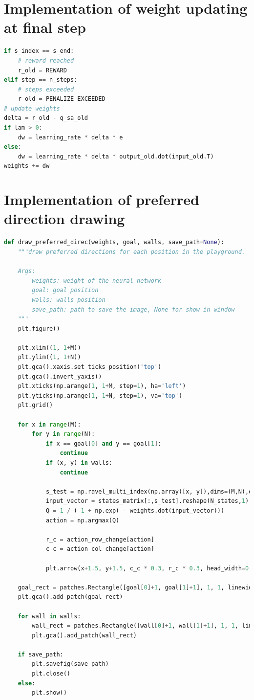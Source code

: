 \documentclass[conference]{IEEEtran}
\begin{document}
\section{Implementation of weight updating at final step}

\begin{lstlisting}[language=Python]
if s_index == s_end:
    # reward reached
    r_old = REWARD
elif step == n_steps:
    # steps exceeded
    r_old = PENALIZE_EXCEEDED
# update weights
delta = r_old - q_sa_old
if lam > 0:
    dw = learning_rate * delta * e
else:
    dw = learning_rate * delta * output_old.dot(input_old.T)
weights += dw

\end{lstlisting}

\section{Implementation of preferred direction drawing}

\begin{lstlisting}[language=Python]
def draw_preferred_direc(weights, goal, walls, save_path=None):
    """draw preferred directions for each position in the playground.

    Args:
        weights: weight of the neural network
        goal: goal position
        walls: walls position
        save_path: path to save the image, None for show in window
    """
    plt.figure()
    
    plt.xlim((1, 1+M))
    plt.ylim((1, 1+N))
    plt.gca().xaxis.set_ticks_position('top')
    plt.gca().invert_yaxis()
    plt.xticks(np.arange(1, 1+M, step=1), ha='left')
    plt.yticks(np.arange(1, 1+N, step=1), va='top')
    plt.grid()

    for x in range(M):
        for y in range(N):
            if x == goal[0] and y == goal[1]:
                continue
            if (x, y) in walls:
                continue

            s_test = np.ravel_multi_index(np.array([x, y]),dims=(M,N),order='F')
            input_vector = states_matrix[:,s_test].reshape(N_states,1)
            Q = 1 / ( 1 + np.exp( - weights.dot(input_vector)))
            action = np.argmax(Q)

            r_c = action_row_change[action]
            c_c = action_col_change[action]
            
            plt.arrow(x+1.5, y+1.5, c_c * 0.3, r_c * 0.3, head_width=0.06, head_length=0.1)

    goal_rect = patches.Rectangle([goal[0]+1, goal[1]+1], 1, 1, linewidth=1, edgecolor='lime', facecolor='lime')
    plt.gca().add_patch(goal_rect)

    for wall in walls:
        wall_rect = patches.Rectangle([wall[0]+1, wall[1]+1], 1, 1, linewidth=1, edgecolor='silver', facecolor='silver')
        plt.gca().add_patch(wall_rect)

    if save_path:
        plt.savefig(save_path)
        plt.close()
    else:
        plt.show()

\end{lstlisting}
\end{document}
